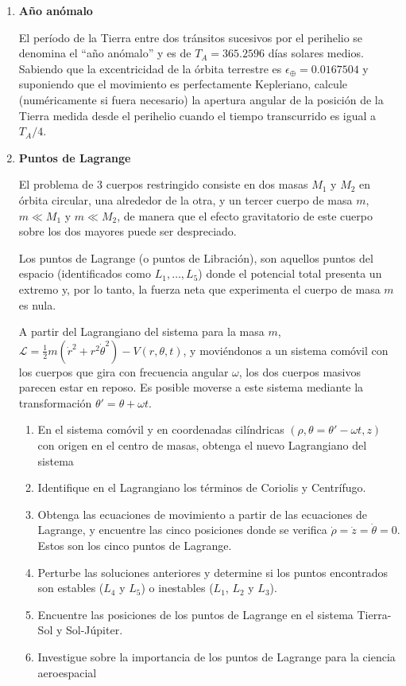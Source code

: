 \documentclass[a4paper,12pt]{article}
\begin{document}
\begin{enumerate}
  \item {\bf{Año anómalo}}

    El período de la Tierra entre dos tránsitos sucesivos por el perihelio
    se denomina el ``año anómalo'' y es de $T_A=365.2596$ días solares
    medios. Sabiendo que la excentricidad de la órbita terrestre es
    $\epsilon_\oplus = 0.0167504$ y suponiendo que el movimiento es
    perfectamente Kepleriano, calcule (numéricamente si fuera necesario)
    la apertura angular de la posición de la Tierra medida desde el
    perihelio cuando el tiempo transcurrido es igual a $T_A/4$.

  \item {\bf{Puntos de Lagrange}}

    El problema de 3 cuerpos restringido consiste en dos masas $M_1$ y
    $M_2$ en órbita circular, una alrededor de la otra, y un tercer cuerpo
    de masa $m$, $m \ll M_1$ y $m \ll M_2$, de manera que el efecto
    gravitatorio de este cuerpo sobre los dos mayores puede ser
    despreciado.

    Los puntos de Lagrange (o puntos de Libración), son aquellos puntos
    del espacio (identificados como $L_1, \ldots, L_5$) donde el potencial
    total presenta un extremo y, por lo tanto, la fuerza neta que
    experimenta el cuerpo de masa $m$ es nula.

    A partir del Lagrangiano del sistema para la masa $m$, $\mathcal{L} =
    \frac12 m \left (\dot{r}^2 + r^2 \dot{\theta}^2 \right ) -
    V(r,\theta,t)$, y moviéndonos a un sistema comóvil con los cuerpos que
    gira con frecuencia angular $\omega$, los dos cuerpos masivos parecen
    estar en reposo. Es posible moverse a este sistema mediante la
    transformación $\theta'=\theta + \omega t$. 
    
    \begin{enumerate} 
      \item En el sistema comóvil y en coordenadas cilíndricas $(\rho,
        \theta=\theta'-\omega t, z)$ con origen en el centro de masas,
        obtenga el nuevo Lagrangiano del sistema
      \item Identifique en el Lagrangiano los términos de Coriolis y
        Centrífugo.
      \item Obtenga las ecuaciones de movimiento a partir de las
        ecuaciones de Lagrange, y encuentre las cinco posiciones donde se
        verifica $\dot{\rho}=\dot{z} = \dot{\theta} = 0$. Estos son los
        cinco puntos de Lagrange.
      \item Perturbe las soluciones anteriores y determine si los puntos
        encontrados son estables ($L_4$ y $L_5$) o inestables ($L_1$,
        $L_2$ y $L_3$).
      \item Encuentre las posiciones de los puntos de Lagrange en el
        sistema Tierra-Sol y Sol-Júpiter.
      \item Investigue sobre la importancia de los puntos de Lagrange para la ciencia aeroespacial
    \end{enumerate}


\end{enumerate}
\end{document}
